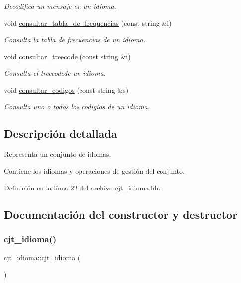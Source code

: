 \begin{DoxyCompactItemize}
\begin{DoxyCompactList}\small\item\em Decodifica un mensaje en un idioma. \end{DoxyCompactList}\item 
void \hyperlink{classcjt__idioma_ae2ab9ad48166bad14e113f748d1a888c}{consultar\+\_\+tabla\+\_\+de\+\_\+frequencias} (const string \&i)
\begin{DoxyCompactList}\small\item\em Consulta la tabla de frecuencias de un idioma. \end{DoxyCompactList}\item 
void \hyperlink{classcjt__idioma_a2d13a4e69a358756359ee6e262de2fb0}{consultar\+\_\+treecode} (const string \&i)
\begin{DoxyCompactList}\small\item\em Consulta el treecodede un idioma. \end{DoxyCompactList}\item 
void \hyperlink{classcjt__idioma_a2e4b954ce7ee66596412c335430e9be8}{consultar\+\_\+codigos} (const string \&s)
\begin{DoxyCompactList}\small\item\em Consulta uno o todos los codigios de un idioma. \end{DoxyCompactList}\end{DoxyCompactItemize}


\subsection{Descripción detallada}
Representa un conjunto de idomas. 

Contiene los idiomas y operaciones de gestión del conjunto. 

Definición en la línea 22 del archivo cjt\+\_\+idioma.\+hh.



\subsection{Documentación del constructor y destructor}
\mbox{\label{classcjt__idioma_a79c18a172e61c3276f352a81c479dfb8}} 
\subsubsection{\texorpdfstring{cjt\+\_\+idioma()}{cjt\_idioma()}}
{\footnotesize\ttfamily cjt\+\_\+idioma\+::cjt\+\_\+idioma (\begin{DoxyParamCaption}{ }\end{DoxyParamCaption})}



